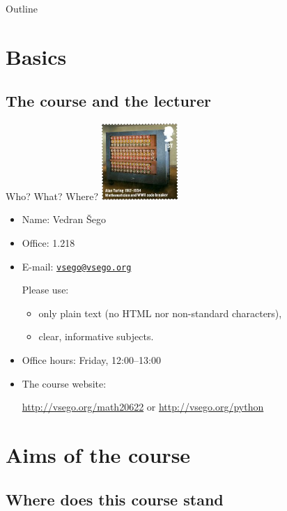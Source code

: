 \documentclass[xcolor=dvipsnames, 12pt]{beamer}
\newcommand{\MYTITLECOLOUR} {\textcolor[rgb]{1.,0.85,0.}}  %
\newenvironment{myFrame}[1]%
{\begin{frame}{\MYTITLECOLOUR{#1}}}%
{\end{frame}}
\begin{document}
\begin{myFrame}{Outline}
\tableofcontents[hideothersubsections]
\end{myFrame}

\section{Basics}

\subsection{The course and the lecturer}

\begin{myFrame}{Who? What? Where?}
\vskip-2mm\hfill\includegraphics[height=29mm]{images/stamp.png}\vskip-19mm
\begin{itemize}
  \item Name: Vedran \v{S}ego
  \item Office: 1.218
  \item E-mail: \href{mailto:vsego@vsego.org}{\texttt{vsego@vsego.org}} \par
    Please use:
    \begin{itemize}
      \item only \alert{plain text} (no HTML nor non-standard characters),
      \item \alert{clear, informative subjects}.
    \end{itemize}
  \item Office hours: Friday, 12:00--13:00
  \item The course website:\par
    \href{http://vsego.org/math20622}{http://vsego.org/math20622} or \href{http://vsego.org/math20622}{http://vsego.org/python}
\end{itemize}
\end{myFrame}



\section{Aims of the course}

\subsection{Where does this course stand}
\end{document}
